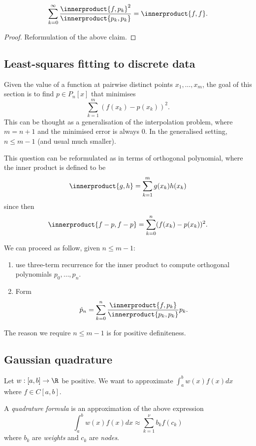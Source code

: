 \documentclass[a4paper]{article}
\newcommand*{\inner}{\innerproduct}
\begin{document}
\begin{theorem}
  \[
    \sum_{k = 0}^\infty \frac{\inner{f, p_k}^2}{\inner{p_k, p_k}} = \inner{f, f}.
  \]
\end{theorem}

\begin{proof}
  Reformulation of the above claim.
\end{proof}

\subsection{Least-squares fitting to discrete data}

Given the value of a function at pairwise distinct points \(x_1, \dots, x_m\), the goal of this section is to find \(p \in P_n[x]\) that minimises
\[
  \sum_{k = 1}^m (f(x_k) - p(x_k))^2.
\]
This can be thought as a generalisation of the interpolation problem, where \(m = n + 1\) and the minimised error is always \(0\). In the generalised setting, \(n \leq m - 1\) (and usual much smaller).

This question can be reformulated as in terms of orthogonal polynomial, where the inner product is defined to be
\[
  \inner{g, h} = \sum_{k = 1}^m g(x_k)h(x_k)
\]
since then
\[
  \inner{f - p, f - p} = \sum_{k = 0}^n (f(x_k) - p(x_k))^2.
\]

We can proceed as follow, given \(n \leq m - 1\):
\begin{enumerate}
\item use three-term recurrence for the inner product to compute orthogonal polynomials \(p_0, \dots, p_n\).
\item Form
  \[
    \hat p_n = \sum_{k = 0}^n \frac{\inner{f, p_k}}{\inner{p_k, p_k}}p_k.
  \]
\end{enumerate}
The reason we require \(n \leq m - 1\) is for positive definiteness.

\subsection{Gaussian quadrature}

\begin{question}
  Let \(w: [a, b] \to \R\) be positive. We want to approximate \(\int_a^b w(x)f(x) dx\) where \(f \in C[a, b]\).
\end{question}
A \emph{quadrature formula} is an approximation of the above expression
\begin{equation}
  \label{eqn:quadrature}
  \int_a^b w(x)f(x) dx \approx \sum_{k = 1}^\nu b_kf(c_k)
  \tag{\(\ast\)}
\end{equation}
where \(b_k\) are \emph{weights} and \(c_k\) are \emph{nodes}.
\end{document}
